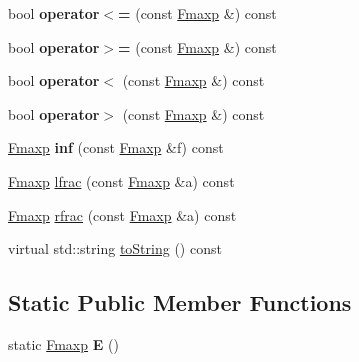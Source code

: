 \begin{DoxyCompactItemize}
\item 
\mbox{\label{classetvo_i_i_1_1_fmaxp_ac7db4ab710b4cde43f70d6626ea98592}} 
bool {\bfseries operator$<$=} (const \mbox{\hyperlink{classetvo_i_i_1_1_fmaxp}{Fmaxp}} \&) const
\item 
\mbox{\label{classetvo_i_i_1_1_fmaxp_a13ec6f5521e1c1ee82458cfa3270ef6c}} 
bool {\bfseries operator$>$=} (const \mbox{\hyperlink{classetvo_i_i_1_1_fmaxp}{Fmaxp}} \&) const
\item 
\mbox{\label{classetvo_i_i_1_1_fmaxp_aab37cf27c2048c453c4f00e27750cb78}} 
bool {\bfseries operator$<$} (const \mbox{\hyperlink{classetvo_i_i_1_1_fmaxp}{Fmaxp}} \&) const
\item 
\mbox{\label{classetvo_i_i_1_1_fmaxp_a14533ec251ebdf8ff52e136a8d7133ca}} 
bool {\bfseries operator$>$} (const \mbox{\hyperlink{classetvo_i_i_1_1_fmaxp}{Fmaxp}} \&) const
\item 
\mbox{\label{classetvo_i_i_1_1_fmaxp_a4064466629ccadd8eccfcb3ea9a64ea3}} 
\mbox{\hyperlink{classetvo_i_i_1_1_fmaxp}{Fmaxp}} {\bfseries inf} (const \mbox{\hyperlink{classetvo_i_i_1_1_fmaxp}{Fmaxp}} \&f) const
\item 
\mbox{\hyperlink{classetvo_i_i_1_1_fmaxp}{Fmaxp}} \mbox{\hyperlink{classetvo_i_i_1_1_fmaxp_ad72699ad7193e83e3412cde79c1a461d}{lfrac}} (const \mbox{\hyperlink{classetvo_i_i_1_1_fmaxp}{Fmaxp}} \&a) const
\item 
\mbox{\hyperlink{classetvo_i_i_1_1_fmaxp}{Fmaxp}} \mbox{\hyperlink{classetvo_i_i_1_1_fmaxp_a60837ce28327bcb91be8f5260d90e40c}{rfrac}} (const \mbox{\hyperlink{classetvo_i_i_1_1_fmaxp}{Fmaxp}} \&a) const
\item 
virtual std\+::string \mbox{\hyperlink{classetvo_i_i_1_1_fmaxp_ac9d63f5e1e7eef10af1e3122f5dd4809}{to\+String}} () const
\end{DoxyCompactItemize}
\subsection*{Static Public Member Functions}
\begin{DoxyCompactItemize}
\item 
\mbox{\label{classetvo_i_i_1_1_fmaxp_aeeda0aa584bb1d93df2fe63f3634107f}} 
static \mbox{\hyperlink{classetvo_i_i_1_1_fmaxp}{Fmaxp}} {\bfseries E} ()
\end{DoxyCompactItemize}
